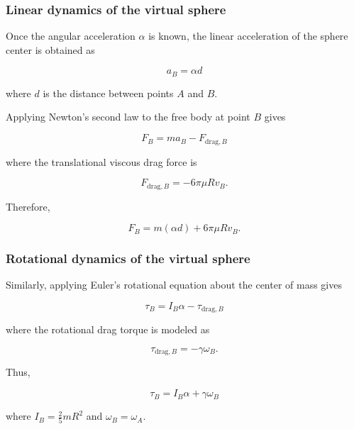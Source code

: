 \documentclass[journal]{IEEEtran}
\begin{document}
\subsubsection{Linear dynamics of the virtual sphere}

Once the angular acceleration $\alpha$ is known, the linear acceleration of the sphere center is obtained as

\begin{equation}
a_B = \alpha d
\end{equation}

where $d$ is the distance between points $A$ and $B$.

Applying Newton's second law to the free body at point $B$ gives

\begin{equation}
F_B = m a_B - F_{\mathrm{drag},B}
\end{equation}

where the translational viscous drag force is

\begin{equation}
F_{\mathrm{drag},B} = -6\pi \mu R v_B.
\end{equation}

Therefore,

\begin{equation}
F_B = m(\alpha d) + 6\pi \mu R v_B.
\end{equation}

\subsubsection{Rotational dynamics of the virtual sphere}

Similarly, applying Euler's rotational equation about the center of mass gives

\begin{equation}
\tau_B = I_B \alpha - \tau_{\mathrm{drag},B}
\end{equation}

where the rotational drag torque is modeled as

\begin{equation}
\tau_{\mathrm{drag},B} = -\gamma \omega_B.
\end{equation}

Thus,

\begin{equation}
\tau_B = I_B \alpha + \gamma \omega_B
\end{equation}

where $I_B = \frac{2}{5}mR^2$ and $\omega_B = \omega_A$.
\end{document}
